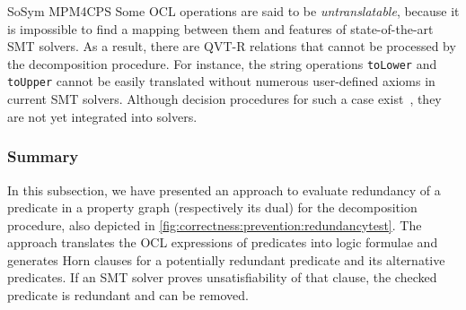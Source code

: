 \begin{copiedFrom}{SoSym MPM4CPS}
Some OCL operations are said to be \textit{untranslatable}, because it is impossible to find a mapping between them and features of state-of-the-art SMT solvers. As a result, there are QVT-R relations that cannot be processed by the decomposition procedure. For instance, the string operations \lstinline{toLower} and \lstinline{toUpper} cannot be easily translated without numerous user-defined axioms in current SMT solvers. Although decision procedures for such a case exist~\cite{veanes2012transducers}, they are not yet integrated into solvers.


\subsubsection*{Summary}
In this subsection, we have presented an approach to evaluate redundancy of a predicate in a property graph (respectively its dual) for the decomposition procedure, also depicted in \autoref{fig:correctness:prevention:redundancytest}.
The approach translates the OCL expressions of predicates into logic formulae and generates Horn clauses for a potentially redundant predicate and its alternative predicates.
If an SMT solver proves unsatisfiability of that clause, the checked predicate is redundant and can be removed.

\end{copiedFrom} %
